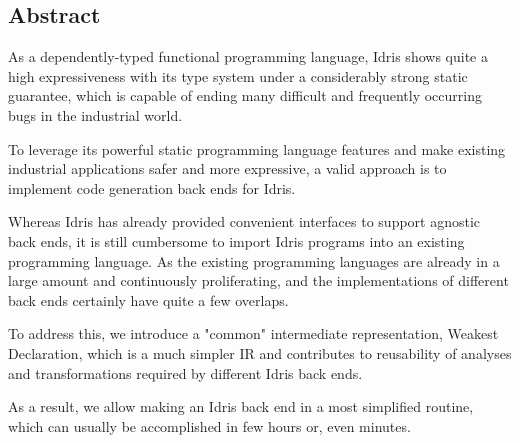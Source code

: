 \documentclass[a1,portrait]{a1poster}
\begin{document}
\begin{multicols}{2} %




\section*{Abstract}

As a dependently-typed functional programming language, Idris shows
quite a high expressiveness with its type system under a considerably strong static guarantee,
which is capable of ending many difficult and frequently occurring bugs in the industrial world.

To leverage its powerful static programming language features and make
existing industrial applications safer and more expressive,
a valid approach is to implement code generation back ends for Idris.

Whereas Idris has already provided convenient interfaces to support
agnostic back ends, it is still cumbersome to import Idris programs
into an existing programming language. As the existing programming languages are already
in a large amount and continuously proliferating, and the implementations
of different back ends certainly have quite a few overlaps.
  
To address this, we introduce a "common" intermediate representation, Weakest Declaration,
which is a much simpler IR and contributes to reusability of analyses and transformations
required by different Idris back ends.

As a result, we allow making an Idris back end in a most simplified routine,
which can usually be accomplished in few hours or, even minutes.




\end{multicols}
\end{document}
